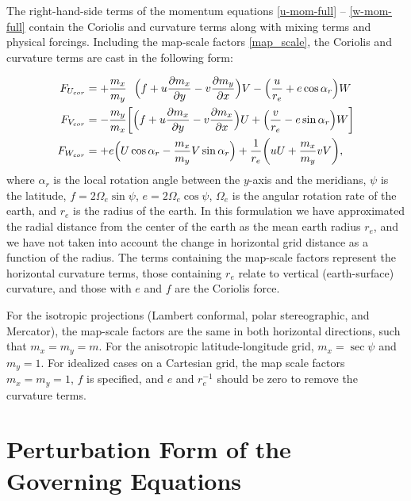 The right-hand-side terms of the momentum equations
\eqref{u-mom-full} -- \eqref{w-mom-full} contain the Coriolis and 
curvature terms along with mixing terms and 
physical forcings.  Including the map-scale factors \eqref{map_scale}, the Coriolis and
curvature terms are cast in the following form:

\begin{align}
F_{U_{cor}} & =  + {m_x\over m_y}
\ \ \Bigl(f + u {\partial m_x \over
\partial y} - v {\partial m_y \over \partial x}\Bigr) V
- \Bigl( {u \over r_e}  + e \cos \alpha_r \Bigr)W \label{u-mom-rhs} 
\\
%
F_{V_{cor}} & = - {m_y\over m_x}\biggl[ \Bigl(f + u {\partial m_x \over
\partial y} - v {\partial m_x \over \partial x}\Bigr) U
+ \Bigl( {v \over r_e} -e \sin \alpha_r \Bigr)W \biggr] \label{v-mom-rhs} 
\\
%
F_{W_{cor}} & = + e \Bigl(U \cos \alpha_r - {m_x\over m_y}V \sin \alpha_r\Bigr) 
+ {1\over r_e}\biggl(uU +{m_x\over m_y}vV \biggr), \label{w-mom-rhs}
\end{align}
\noindent
where $\alpha_r$ is the local rotation angle between the $y$-axis and the
meridians, $\psi$ is the latitude, $f = 2 \Omega_e \sin \psi $, $e = 2
\Omega_e \cos \psi$, $\Omega_e$ is the angular rotation rate of the earth,
and $r_e$ is the radius of the earth.  In this
formulation we have approximated the radial distance from the center of
the earth as the mean earth radius $r_e$, and we have not taken into account
the change in horizontal grid distance as a function of the radius.
The terms containing the map-scale factors represent the horizontal curvature terms, those
containing $r_e$ relate to vertical (earth-surface) curvature, and those
with $e$ and $f$ are the Coriolis force.


 For the isotropic projections 
(Lambert conformal, polar stereographic, and Mercator), the map-scale factors are the same in both horizontal directions, such that $m_x=m_y=m$. For the anisotropic latitude-longitude grid, $m_x=\sec\psi$ and $m_y=1$.
For idealized cases on a Cartesian grid, the map scale factors $m_x = m_y = 1$, 
$f$ is specified, and $e$ and $r_e^{-1}$ should be zero to remove the curvature terms.

\section{Perturbation Form of the Governing Equations}

